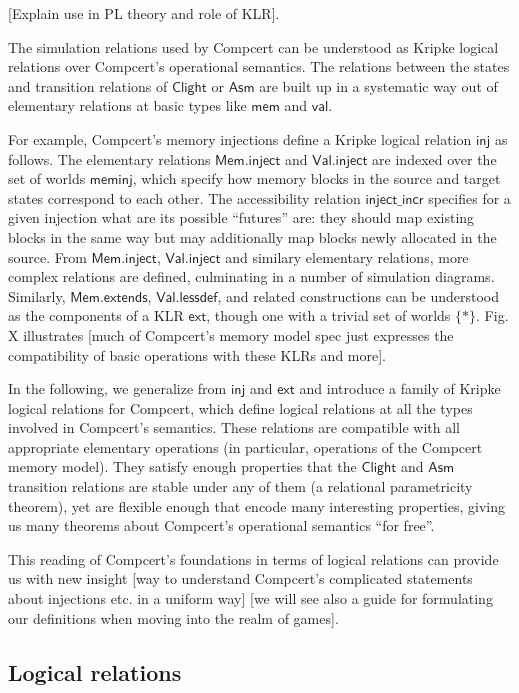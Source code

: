 \documentclass[acmsmall,anonymous]{acmart}
\newcommand{\kw}[1]{\ensuremath{ \textsf{#1} }}
\begin{document}
[Explain use in PL theory and role of KLR].

The simulation relations used by Compcert can be understood
as Kripke logical relations over
Compcert's operational semantics.
The relations between
the states and transition relations of \kw{Clight} or \kw{Asm}
are built up in a systematic way out of elementary relations
at basic types like \kw{mem} and \kw{val}.

For example,
Compcert's memory injections
define a Kripke logical relation \kw{inj} as follows.
The elementary relations \kw{Mem.inject} and \kw{Val.inject}
are indexed over the set of worlds \kw{meminj},
which specify how memory blocks in the source and target states
correspond to each other.
The accessibility relation \kw{inject\_incr}
specifies for a given injection
what are its possible ``futures'' are:
they should map existing blocks in the same way
but may additionally map blocks newly allocated in the source.
From \kw{Mem.inject}, \kw{Val.inject} and similary elementary relations,
more complex relations are defined,
culminating in a number of simulation diagrams.
Similarly,
\kw{Mem.extends}, \kw{Val.lessdef}, and related constructions
can be understood as the components of a KLR \kw{ext},
though one with a trivial set of worlds $\{*\}$.
Fig. X illustrates [much of Compcert's memory model spec
just expresses the compatibility of basic operations
with these KLRs and more].

In the following,
we generalize from \kw{inj} and \kw{ext} and
introduce a family of Kripke logical relations for Compcert,
which define logical relations at all the types
involved in Compcert's semantics.
These relations are compatible with
all appropriate elementary operations
(in particular, operations of the Compcert memory model).
They satisfy enough properties that
the \kw{Clight} and \kw{Asm} transition relations
are stable under any of them
(a relational parametricity theorem),
yet are flexible enough that encode many interesting properties,
giving us many theorems about Compcert's operational semantics
``for free''.

This reading of Compcert's foundations
in terms of logical relations
can provide us with new insight
[way to understand Compcert's complicated
statements about injections etc. in a uniform way]
[we will see also a guide for formulating our definitions
when moving into the realm of games].


\subsection{Logical relations}
\end{document}

